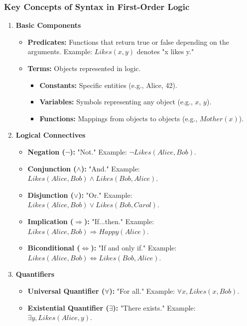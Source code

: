 \documentclass[aspectratio=169]{beamer}
\begin{document}
\begin{frame}[fragile]
    \frametitle{Key Concepts of Syntax in First-Order Logic}
    \begin{enumerate}
        \item \textbf{Basic Components}
            \begin{itemize}
                \item \textbf{Predicates:} Functions that return true or false depending on the arguments. Example: \(Likes(x, y)\) denotes "x likes y."
                \item \textbf{Terms:} Objects represented in logic.
                    \begin{itemize}
                        \item \textbf{Constants:} Specific entities (e.g., Alice, 42).
                        \item \textbf{Variables:} Symbols representing any object (e.g., \(x\), \(y\)).
                        \item \textbf{Functions:} Mappings from objects to objects (e.g., \(Mother(x)\)).
                    \end{itemize}
            \end{itemize}
        
        \item \textbf{Logical Connectives}
            \begin{itemize}
                \item \textbf{Negation (\(\neg\)):} "Not." Example: \(\neg Likes(Alice, Bob)\).
                \item \textbf{Conjunction (\(\land\)):} "And." Example: \(Likes(Alice, Bob) \land Likes(Bob, Alice)\).
                \item \textbf{Disjunction (\(\lor\)):} "Or." Example: \(Likes(Alice, Bob) \lor Likes(Bob, Carol)\).
                \item \textbf{Implication (\(\Rightarrow\)):} "If...then." Example: \(Likes(Alice, Bob) \Rightarrow Happy(Alice)\).
                \item \textbf{Biconditional (\(\Leftrightarrow\)):} "If and only if." Example: \(Likes(Alice, Bob) \Leftrightarrow Likes(Bob, Alice)\).
            \end{itemize}

        \item \textbf{Quantifiers}
            \begin{itemize}
                \item \textbf{Universal Quantifier (\(\forall\)):} "For all." Example: \(\forall x, Likes(x, Bob)\).
                \item \textbf{Existential Quantifier (\(\exists\)):} "There exists." Example: \(\exists y, Likes(Alice, y)\).
            \end{itemize}
    \end{enumerate}
\end{frame}
\end{document}
